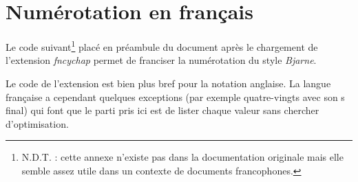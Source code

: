 \documentclass{report}
\begin{document}
  \appendix
  \chapter{Numérotation en français} \label{french}

    Le code suivant\footnote{N.D.T. : cette annexe n'existe pas dans la 
    documentation originale mais elle semble assez utile dans un contexte de 
    documents francophones.} placé en préambule du document après le chargement
    de l'extension \textsl{fncychap} permet de franciser la numérotation du
    style \emph{Bjarne}. 

    Le code de l'extension est bien plus bref pour la notation anglaise. La
    langue française a cependant quelques exceptions (par exemple 
    \og quatre-vingts \fg{} avec son \og s \fg{} final) qui font que le
    parti pris ici est de lister chaque valeur sans chercher d'optimisation.
\end{document}
